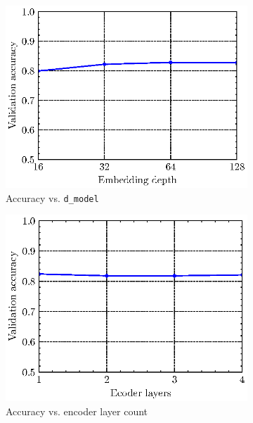\documentclass[12pt, hidelinks]{article}
\begin{document}
\begin{figure}
    \centering
    \begin{subfigure}[b]{0.45\textwidth}
        \includegraphics[width=\textwidth]{assets/acc_vs_hyperparam/emb_depth.eps}
        \caption{Accuracy vs. \texttt{d\_model}}
        \label{fig:emd_depth_acc}
    \end{subfigure}
    \hfill
    \begin{subfigure}[b]{0.45\textwidth}
        \includegraphics[width=\textwidth]{assets/acc_vs_hyperparam/enc_layer.eps}
        \caption{Accuracy vs. encoder layer count}
        \label{fig:enc_layer_acc}
    \end{subfigure}
    \vfill
    \begin{subfigure}[b]{0.45\textwidth}

\end{subfigure}
\end{figure}
\end{document}
